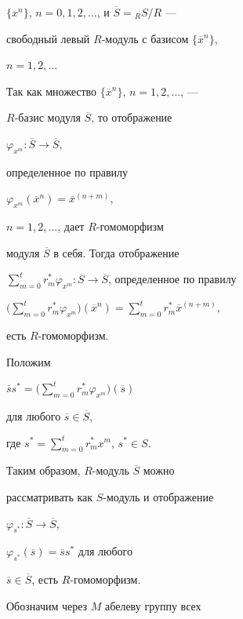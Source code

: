 \begin{exam}
$\{ x^n \}$, $n=0,1,2,\dotsc$, и $\overline{S}={_R}S/R$ --- 


свободный левый $R$-модуль с базисом $\{ \overline{x}^n \}$, 


$n=1,2,\dotsc$





Так как множество $\{ \overline{x}^n \}$, $n=1,2,\dotsc$, --- 


$R$-базис модуля $\overline {S}$, то отображение 


$\varphi_{x^m} : \overline{S} \rightarrow \overline {S}$, 


определенное по правилу 


$\varphi_{x^m} (\overline {x}^n) =\overline{x}^{(n+m)}$, 


$n=1,2,\dotsc$, дает $R$-гомоморфизм 


модуля $\overline {S}$ в себя. Тогда отображение 


$\sum \limits_{m=0}^{t} r^{*}_{m} \varphi_{x^m}: 


\overline{S} \rightarrow \overline {S}$, определенное по правилу


$\Big(\sum \limits_{m=0}^{t} r^{*}_{m} \varphi_{x^m}\Big) (\overline {x}^n)=


\sum \limits_{m=0}^{t} r^{*}_{m} \overline {x}^{(n+m)}$,


есть $R$-гомоморфизм.


Положим 


$\overline{s} s^{*}=


\Big(\sum \limits_{m=0}^{t} r^{*}_{m} \varphi_{x^m}\Big) (\overline {s})$


для любого $\overline {s} \in \overline {S}$,


где $s^*=\sum \limits_{m=0}^{t} r^{*}_{m} x^m$, $s^* \in S$.





Таким образом, $R$-модуль $\overline{S}$ можно 


рассматривать как $S$-модуль и отображение 


$\varphi_{s^*} : \overline{S} \rightarrow \overline {S}$, 


$\varphi_{s^*} (\overline {s}) =\overline{s} s^*$ для любого 


$\overline {s} \in \overline{S}$, есть $R$-гомоморфизм.





Обозначим через $M$ абелеву группу всех 



\end{exam}
